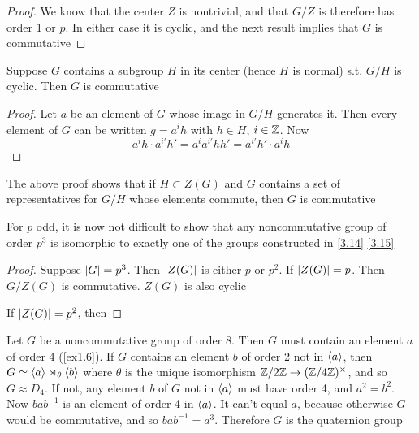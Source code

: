 \documentclass[11pt]{article}
\begin{document}
\begin{proof}
We know that the center \(Z\) is nontrivial, and that \(G/Z\) is therefore has order 1 or \(p\).
In either case it is cyclic, and the next result implies that \(G\) is commutative
\end{proof}

\begin{lemma}[]
Suppose \(G\) contains a subgroup \(H\) in its center (hence \(H\) is normal) s.t. \(G/H\) is
cyclic. Then \(G\) is commutative
\end{lemma}

\begin{proof}
Let \(a\) be an element of \(G\) whose image in \(G/H\) generates it. Then every element
of \(G\) can be written \(g=a^ih\) with \(h\in H\), \(i\in\mathbb{Z}\). Now
\begin{equation*}
a^ih\cdot a^{i'}h'=a^ia^{i'}hh'=a^{i'}h'\cdot a^ih
\end{equation*}
\end{proof}

The above proof shows that if \(H\subset Z(G)\) and \(G\) contains a set of representatives
for \(G/H\) whose elements commute, then \(G\) is commutative

For \(p\) odd, it is now not difficult to show that any noncommutative group of order \(p^3\) is
isomorphic to exactly one of the groups constructed in \ref{3.14} \ref{3.15}

\begin{proof}
Suppose \(\abs{G}=p^3\). Then \(\abs{Z(G)}\) is either \(p\) or \(p^2\). If \(\abs{Z(G)}=p\).
Then \(G/Z(G)\) is commutative. \(Z(G)\) is also cyclic

If \(\abs{Z(G)}=p^2\), then
\end{proof}

\begin{examplle}[]
Let \(G\) be a noncommutative group of order 8. Then \(G\) must contain an element \(a\) of order 4
(\ref{ex1.6}). If \(G\) contains an element \(b\) of order 2 not in \(\langle a\rangle\),
then \(G\simeq\langle a\rangle\rtimes_\theta\langle b\rangle\) where \(\theta\) is the unique isomorphism \(\mathbb{Z}/2\mathbb{Z}\to(\mathbb{Z}/4\mathbb{Z})^\times\), and so \(G\approx D_4\). If
not, any element \(b\) of \(G\) not in \(\langle a\rangle\) must have order 4, and \(a^2=b^2\).
Now \(bab^{-1}\) is an element of order 4 in \(\langle a\rangle\). It can't equal \(a\), because
otherwise \(G\) would be commutative, and so \(bab^{-1}=a^3\). Therefore \(G\) is the quaternion group
\end{examplle}
\end{document}
